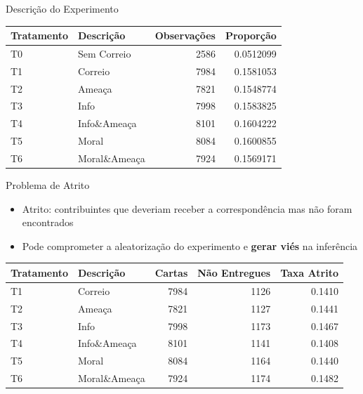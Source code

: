 \documentclass[
  12pt,
  ignorenonframetext,
  aspectratio=169]{beamer}
\providecommand{\tightlist}{%
  \setlength{\itemsep}{0pt}\setlength{\parskip}{0pt}}
\begin{document}
\begin{frame}{Descrição do Experimento}
\protect\hypertarget{descriuxe7uxe3o-do-experimento}{}
\begin{table}[H]

\centering
\begin{tabular}[t]{llrr}
\toprule
Tratamento & Descrição & Observações & Proporção\\
\midrule
T0 & Sem Correio & 2586 & 0.0512099\\
T1 & Correio & 7984 & 0.1581053\\
T2 & Ameaça & 7821 & 0.1548774\\
T3 & Info & 7998 & 0.1583825\\
T4 & Info\&Ameaça & 8101 & 0.1604222\\
T5 & Moral & 8084 & 0.1600855\\
T6 & Moral\&Ameaça & 7924 & 0.1569171\\
\bottomrule
\end{tabular}
\end{table}
\end{frame}

\begin{frame}{Problema de Atrito}
\protect\hypertarget{problema-de-atrito}{}
\begin{itemize}
\tightlist
\item
  Atrito: contribuintes que deveriam receber a correspondência mas não
  foram encontrados
\item
  Pode comprometer a aleatorização do experimento e \textbf{gerar viés}
  na inferência
\end{itemize}

\begin{table}[H]
\centering
\begin{threeparttable}
\footnotesize
\begin{tabular}[t]{llrrr}

\toprule
Tratamento & Descrição & Cartas & Não Entregues & Taxa Atrito\\
\midrule
T1 & Correio & 7984 &  1126 & 0.1410\\
T2 & Ameaça & 7821 &  1127 & 0.1441\\
T3 & Info & 7998 &  1173 & 0.1467\\
T4 & Info\&Ameaça & 8101 &  1141 & 0.1408\\
T5 & Moral & 8084 &  1164 & 0.1440\\
\addlinespace
T6 & Moral\&Ameaça & 7924 & 1174 & 0.1482\\
\bottomrule
\end{tabular}
\end{threeparttable}
\end{table}
\end{frame}
\end{document}
